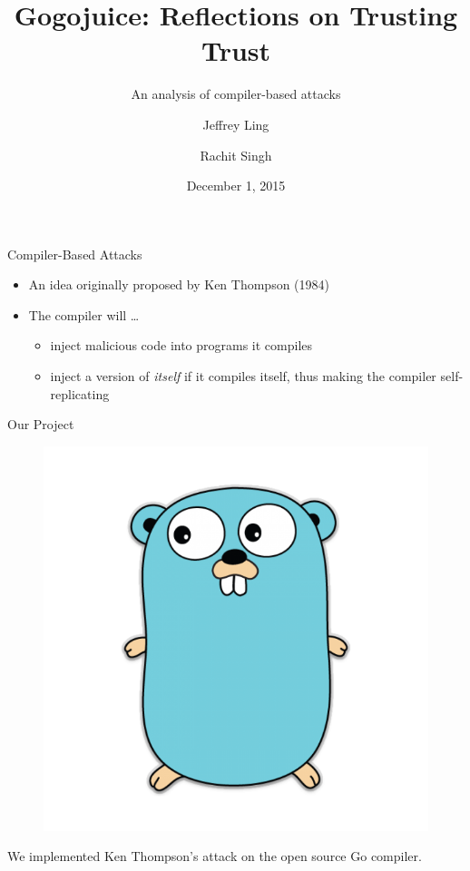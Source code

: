 \documentclass{beamer}
\title[Gogojuice] %
{Gogojuice: Reflections on Trusting Trust}
\subtitle
{An analysis of compiler-based attacks} %
\author %
{Jeffrey Ling \and Rachit Singh}
\institute[CS 263 '15] %
{
  CS 263 '15}
\date %
{December 1, 2015}
\begin{document}
\begin{frame}
  \titlepage
\end{frame}



\begin{frame}{Compiler-Based Attacks} %

  \begin{itemize}
  \item An idea originally proposed by Ken Thompson (1984)
  \item The compiler will \dots
	\begin{itemize}
		\item inject malicious code into programs it compiles
		\pause
		\item inject a version of \emph{itself} if it compiles itself, thus making the compiler self-replicating
	\end{itemize}
  \end{itemize}
\end{frame}

\begin{frame}{Our Project}
	\begin{figure}
	\centering
	\includegraphics[scale=0.2]{gopher}
	\end{figure}
	We implemented Ken Thompson's attack on the open source Go compiler.
\end{frame}
\end{document}
